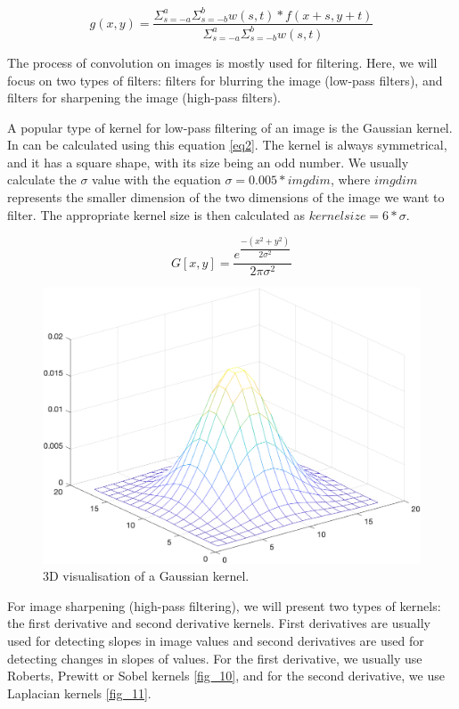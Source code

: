 \documentclass[9pt]{IEEEtran}
\begin{document}
\begin{equation} \label{eq1}
g(x, y) = \dfrac{\Sigma_{s=-a}^a  \Sigma_{s=-b}^b w(s, t) * f(x + s, y + t)}{\Sigma_{s=-a}^a  \Sigma_{s=-b}^b w(s, t) }
 \end{equation}
  
 The process of convolution on images is mostly used for filtering. Here, we will focus on two types of filters: filters for blurring the image (low-pass filters), and filters for sharpening the image (high-pass filters).
 
 A popular type of kernel for low-pass filtering of an image is the Gaussian kernel. In can be calculated using this equation \ref{eq2}. The kernel is always symmetrical, and it has a square shape, with its size being an odd number. We usually calculate the $\sigma$ value with the equation $\sigma = 0.005*imgdim$, where $imgdim$ represents the smaller dimension of the two dimensions of the image we want to filter. The appropriate kernel size is then calculated as $ kernelsize = 6*\sigma $.
 
 \begin{equation} \label{eq2}
G[x, y] = \dfrac{e^{\dfrac{ -(x^2 + y^2)}{2\sigma^2}}}{2\pi\sigma^2}
 \end{equation}
 
 
\begin{figure}[!htb]
\centering
\includegraphics[width=1\columnwidth]{gaussian_kernel.png}
\caption[c1]{ 3D visualisation of a Gaussian kernel. }
\label{fig_1}
\end{figure}
 
 For image sharpening (high-pass filtering), we will present two types of kernels: the first derivative and second derivative kernels. First derivatives are usually used for detecting slopes in image values and second derivatives are used for detecting changes in slopes of values. For the first derivative, we usually use Roberts, Prewitt or Sobel kernels \ref{fig_10}, and for the second derivative, we use Laplacian kernels \ref{fig_11}.
 
\end{document}
